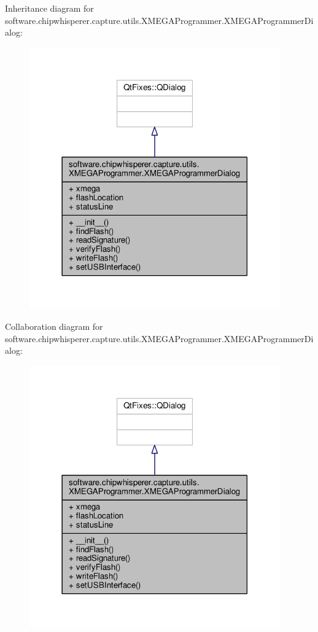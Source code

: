 Inheritance diagram for software.\+chipwhisperer.\+capture.\+utils.\+X\+M\+E\+G\+A\+Programmer.\+X\+M\+E\+G\+A\+Programmer\+Dialog\+:\nopagebreak
\begin{figure}[H]
\begin{center}
\leavevmode
\includegraphics[width=306pt]{d3/dca/classsoftware_1_1chipwhisperer_1_1capture_1_1utils_1_1XMEGAProgrammer_1_1XMEGAProgrammerDialog__inherit__graph}
\end{center}
\end{figure}


Collaboration diagram for software.\+chipwhisperer.\+capture.\+utils.\+X\+M\+E\+G\+A\+Programmer.\+X\+M\+E\+G\+A\+Programmer\+Dialog\+:\nopagebreak
\begin{figure}[H]
\begin{center}
\leavevmode
\includegraphics[width=306pt]{d1/da7/classsoftware_1_1chipwhisperer_1_1capture_1_1utils_1_1XMEGAProgrammer_1_1XMEGAProgrammerDialog__coll__graph}
\end{center}
\end{figure}


